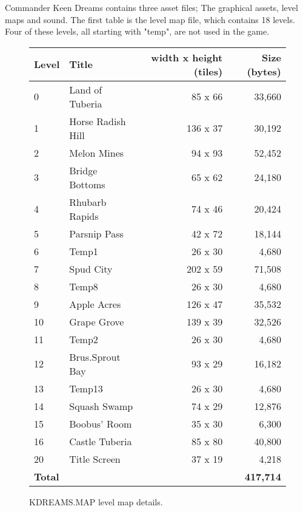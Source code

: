 \documentclass[book.tex]{subfiles}
\begin{document}
\label{asset_details}


Commander Keen Dreams contains three asset files; The graphical assets, level maps and sound. The first table is the level map file, which contains 18 levels. Four of these levels, all starting with "temp", are not used in the game.

\begin{figure}[H]
\centering
{\renewcommand{\arraystretch}{1.1} %
\begin{tabularx}{\textwidth}[c]{X X r r }
  \hline
  \textbf{Level} & \textbf{Title} & \textbf{width x height (tiles)} & \textbf{Size (bytes)}\\ \hline
	0 & Land of Tuberia & 85 x 66 &  33,660 \\
	1 & Horse Radish Hill & 136 x 37 &   30,192 \\ 
	2 & Melon Mines & 94 x 93 &   52,452 \\
	3 & Bridge Bottoms & 65 x 62 &  24,180 \\
	4 & Rhubarb Rapids & 74 x 46 &  20,424 \\
	5 & Parsnip Pass & 42 x 72 &   18,144 \\
	6 & Temp1 & 26 x 30 &   4,680 \\
	7 & Spud City & 202 x 59 &  71,508 \\
	8 & Temp8 & 26 x 30 &  4,680 \\
	9 & Apple Acres & 126 x 47 &  35,532 \\
	10 & Grape Grove & 139 x 39 &  32,526 \\
	11 & Temp2 & 26 x 30 &  4,680 \\
	12 & Brus.Sprout Bay & 93 x 29 &  16,182 \\
	13 & Temp13 & 26 x 30 &  4,680 \\
	14 & Squash Swamp & 74 x 29 &  12,876 \\
	15 & Boobus' Room & 35 x 30 &  6,300 \\
	16 & Castle Tuberia & 85 x 80 &  40,800 \\
	20 & Title Screen & 37 x 19 &  4,218 \\ \hline
	\textbf{Total} & \multicolumn{3}{r}{\textbf{417,714}} \\ \hline
\end{tabularx}
}
\caption{KDREAMS.MAP level map details.}
\end{figure}
\end{document}
